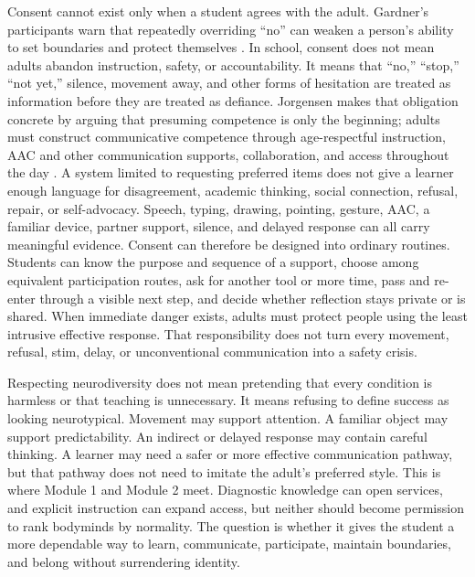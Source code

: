 \vspace{-0.2cm}
Consent cannot exist only when a student agrees with the adult. Gardner's participants warn that repeatedly overriding ``no'' can weaken a person's ability to set boundaries and protect themselves \citep{gardner2017firsthand}. In school, consent does not mean adults abandon instruction, safety, or accountability. It means that ``no,'' ``stop,'' ``not yet,'' silence, movement away, and other forms of hesitation are treated as information before they are treated as defiance. Jorgensen makes that obligation concrete by arguing that presuming competence is only the beginning; adults must construct communicative competence through age-respectful instruction, AAC and other communication supports, collaboration, and access throughout the day \citep{jorgensen2018competence}. A system limited to requesting preferred items does not give a learner enough language for disagreement, academic thinking, social connection, refusal, repair, or self-advocacy. Speech, typing, drawing, pointing, gesture, AAC, a familiar device, partner support, silence, and delayed response can all carry meaningful evidence. Consent can therefore be designed into ordinary routines. Students can know the purpose and sequence of a support, choose among equivalent participation routes, ask for another tool or more time, pass and re-enter through a visible next step, and decide whether reflection stays private or is shared. When immediate danger exists, adults must protect people using the least intrusive effective response. That responsibility does not turn every movement, refusal, stim, delay, or unconventional communication into a safety crisis.

\vspace{-0.2cm}

\vspace{-0.2cm}
Respecting neurodiversity does not mean pretending that every condition is harmless or that teaching is unnecessary. It means refusing to define success as looking neurotypical. Movement may support attention. A familiar object may support predictability. An indirect or delayed response may contain careful thinking. A learner may need a safer or more effective communication pathway, but that pathway does not need to imitate the adult's preferred style. This is where Module 1 and Module 2 meet. Diagnostic knowledge can open services, and explicit instruction can expand access, but neither should become permission to rank bodyminds by normality. The question is whether it gives the student a more dependable way to learn, communicate, participate, maintain boundaries, and belong without surrendering identity.
